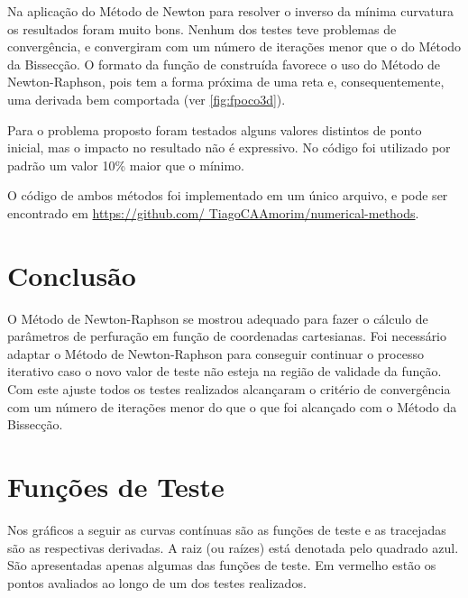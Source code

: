 \documentclass[final,5p]{elsarticle}
\numberwithin{equation}{section}
\begin{document}
    Na aplicação do Método de Newton para resolver o inverso da mínima curvatura os resultados foram muito bons. Nenhum dos testes teve problemas de convergência, e convergiram com um número de iterações menor que o do Método da Bissecção. O formato da função de construída favorece o uso do Método de Newton-Raphson, pois tem a forma próxima de uma reta e, consequentemente, uma derivada bem comportada (ver \ref{fig:fpoco3d}).

    Para o problema proposto foram testados alguns valores distintos de ponto inicial, mas o impacto no resultado não é expressivo. No código foi utilizado por padrão um valor 10\% maior que o mínimo. 

    O código de ambos métodos foi implementado em um único arquivo, e pode ser encontrado em \href{https://github.com/TiagoCAAmorim/numerical-methods/blob/main/02_NewtonRaphson/02_newton_raphson.c}{https://github.com/ TiagoCAAmorim/numerical-methods}.

    \section{Conclusão}
    
    O Método de Newton-Raphson se mostrou adequado para fazer o cálculo de parâmetros de perfuração em função de coordenadas cartesianas. Foi necessário adaptar o Método de Newton-Raphson para conseguir continuar o processo iterativo caso o novo valor de teste não esteja na região de validade da função. Com este ajuste todos os testes realizados alcançaram o critério de convergência com um número de iterações menor do que o que foi alcançado com o Método da Bissecção.

    

\appendix

\section{Funções de Teste}

Nos gráficos a seguir as curvas contínuas são as funções de teste e as tracejadas são as respectivas derivadas. A raiz (ou raízes) está denotada pelo quadrado azul. São apresentadas apenas algumas das funções de teste. Em vermelho estão os pontos avaliados ao longo de um dos testes realizados.
\end{document}
